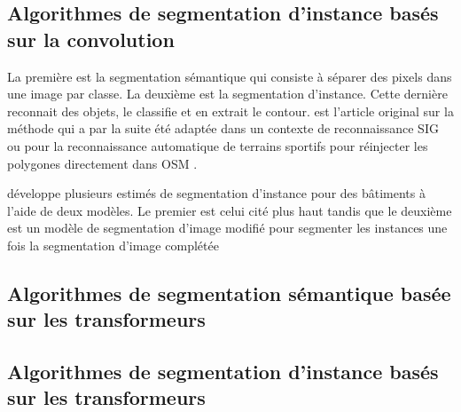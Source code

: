   \subsection{Algorithmes de segmentation d'instance basés sur la convolution}
  La première est la segmentation sémantique qui consiste à séparer des pixels dans une image par classe. La deuxième est la segmentation d'instance. Cette dernière reconnait des objets, le classifie et en extrait le contour. \textcite{He:MaskRCNN:2018} est l'article original sur la méthode qui a par la suite été adaptée dans un contexte de reconnaissance SIG \parencite{Pesek:MaskRCNN:2018} ou pour la reconnaissance automatique de terrains sportifs pour réinjecter les polygones directement dans \ac{OSM} \parencite{Remillard:JremillardImagestoosm:2024}.\par
  \textcite{Fritz:InstanceSegmentation:2020} développe plusieurs estimés de segmentation d'instance pour des bâtiments à l'aide de deux modèles. Le premier est celui cité plus haut\parencite{He:MaskRCNN:2018} tandis que le deuxième est un modèle de segmentation d'image modifié pour segmenter les instances \parencite{Iglovikov:TernausNetV2Fully:2018} une fois la segmentation d'image complétée
  \subsection{Algorithmes de segmentation sémantique basée sur les transformeurs}
  \subsection{Algorithmes de segmentation d'instance basés sur les transformeurs}
